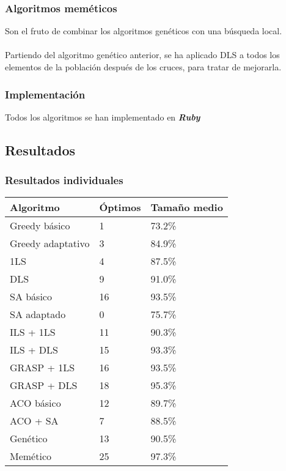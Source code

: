 \documentclass{beamer}
\begin{document}

\begin{frame}
  \frametitle{Algoritmos meméticos}
  Son el fruto de combinar los algoritmos genéticos con una búsqueda local.  \\~\\

  Partiendo del algoritmo genético anterior, se ha aplicado DLS a todos los elementos de la población después de
  los cruces, para tratar de mejorarla.

\end{frame}

\begin{frame}
  \frametitle{Implementación}

  Todos los algoritmos se han implementado en \textbf{\emph{Ruby}}

\end{frame}



\subsection{Resultados}

\begin{frame}
\frametitle{Resultados individuales}

  \tiny
  \begin{table}
  \begin{tabular}{l l l}
    \textbf{Algoritmo} & \textbf{Óptimos} & \textbf{Tamaño medio}  \\ \hline
    Greedy básico          & 1  & 73.2\% \\ \hline
    Greedy adaptativo      & 3  & 84.9\% \\ \hline
    1LS                    & 4  & 87.5\% \\ \hline
    DLS                    & 9  & 91.0\% \\ \hline
    SA básico              & 16  & 93.5\% \\ \hline
    SA adaptado            & 0  & 75.7\% \\ \hline
    ILS + 1LS              & 11  & 90.3\% \\ \hline
    ILS + DLS              & 15  & 93.3\%  \\ \hline
    GRASP + 1LS            & 16  & 93.5\% \\ \hline
    GRASP + DLS            & 18  & 95.3\% \\ \hline
    ACO básico             & 12  & 89.7\% \\ \hline
    ACO + SA               & 7  & 88.5\% \\ \hline
    Genético               & 13  & 90.5\% \\ \hline
    Memético               & 25  & 97.3\% \\ \hline
    \end{tabular}
  \end{table}
\end{frame}
\end{document}
